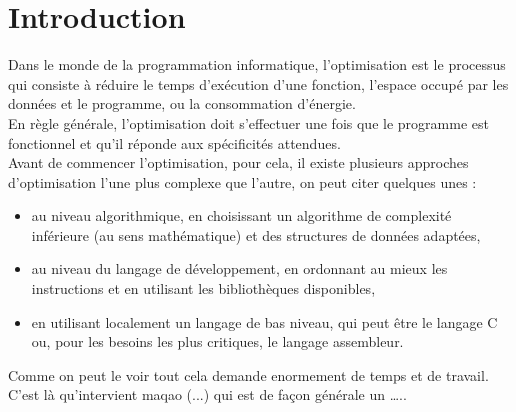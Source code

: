 \section*{Introduction}

Dans le monde de la programmation informatique, l’optimisation est le processus qui consiste à réduire le temps d'exécution d’une fonction, l’espace occupé par les données et le programme, ou la consommation d'énergie.\\

En règle générale, l'optimisation doit s’effectuer une fois que le programme est fonctionnel et qu’il réponde aux spécificités attendues.\\

Avant de commencer l'optimisation, pour cela, il existe plusieurs approches d’optimisation l’une plus complexe que l’autre, on peut citer quelques unes :

\begin{itemize}
    \item au niveau algorithmique, en choisissant un algorithme de complexité inférieure (au sens mathématique) et des structures de données adaptées,
    
    \item au niveau du langage de développement, en ordonnant au mieux les instructions et en utilisant les bibliothèques disponibles,
    
    \item en utilisant localement un langage de bas niveau, qui peut être le langage C ou, pour les besoins les plus critiques, le langage assembleur.

\end{itemize}

	Comme on peut le voir tout cela demande enormement de temps et de travail. C’est là qu'intervient maqao (...) qui est de façon générale un …..






